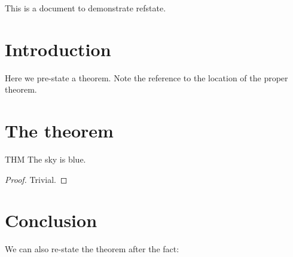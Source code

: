\documentclass{scrartcl}
\theoremstyle{plain}
\begin{document}
This is a document to demonstrate refstate.

\section{Introduction}

Here we pre-state a theorem. Note the reference to the location of the proper theorem.


\newpage

\section{The theorem}

\begin{store}{THM}\label{thmmain}
    The sky is blue.
\end{store}
\begin{proof}
    Trivial.
\end{proof}

\section{Conclusion}

We can also re-state the theorem after the fact:

\end{document}
